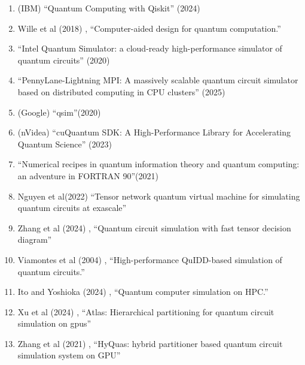 \documentclass[a4paper,fleqn]{cas-sc}
\begin{document}
\begin{enumerate}
\item (IBM) ``Quantum Computing with Qiskit'' (2024) \cite{javadi2024quantum}
\item Wille et al (2018) \cite{wille2018computer}, ``Computer-aided design for quantum computation.''
\item ``Intel Quantum Simulator: a cloud-ready high-performance
 simulator of quantum circuits'' (2020) \cite{Guerreschi_Intel_Quantum_Simulator_2020}
\item ``PennyLane-Lightning MPI: A massively scalable quantum circuit simulator based on distributed computing in CPU clusters'' (2025) \cite{kang2025pennylane}
\item (Google) ``qsim''(2020) \cite{quantum_ai_team_and_collaborators_2020_4023103}
\item (nVidea) ``cuQuantum SDK: A High-Performance Library for Accelerating Quantum Science'' (2023) \cite{10313722}
\item ``Numerical recipes in quantum information theory and quantum computing: an adventure in FORTRAN 90''(2021) \cite{ramkarthik2021numerical}
\item Nguyen et al(2022) \cite{nguyen2022tensor}
``Tensor network quantum virtual machine for simulating quantum circuits at exascale''
\item Zhang et al (2024) \cite{zhang2024quantum}, ``Quantum circuit simulation with fast tensor decision diagram''
\item Viamontes et al (2004) \cite{viamontes2004high}, ``High-performance QuIDD-based simulation of quantum circuits.''
\item Ito and Yoshioka (2024) \cite{Ito2024}, ``Quantum computer simulation on HPC.''
\item Xu et al (2024) \cite{xu2024atlas}, ``Atlas: Hierarchical partitioning for quantum circuit simulation on gpus''
\item Zhang et al (2021) \cite{zhang2021hyquas}, ``HyQuas: hybrid partitioner based quantum circuit simulation system on GPU''

\end{enumerate}
\end{document}
